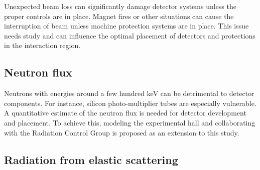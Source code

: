 Unexpected beam loss can significantly damage detector systems unless the proper controls are in place.  Magnet fires or other situations can cause the interruption of beam unless machine protection systems are in place.  This issue needs study and can influence the optimal placement of detectors and protections in the interaction region.

\subsection{Neutron flux}

Neutrons with energies around a few hundred keV can be detrimental to detector components. For instance, silicon photo-multiplier tubes are especially vulnerable.  A quantitative estimate of the neutron flux is needed for detector development and placement.  To achieve this, modeling the experimental hall and collaborating with the Radiation Control Group is proposed as an extension to this study.

\subsection{Radiation from elastic scattering}


